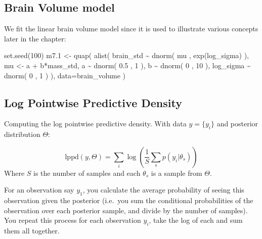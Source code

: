 \documentclass[
]{book}
\newenvironment{Shaded}{\begin{snugshade}}{\end{snugshade}}
\newcommand{\AttributeTok}[1]{\textcolor[rgb]{0.77,0.63,0.00}{#1}}
\newcommand{\DecValTok}[1]{\textcolor[rgb]{0.00,0.00,0.81}{#1}}
\newcommand{\FloatTok}[1]{\textcolor[rgb]{0.00,0.00,0.81}{#1}}
\newcommand{\FunctionTok}[1]{\textcolor[rgb]{0.00,0.00,0.00}{#1}}
\newcommand{\NormalTok}[1]{#1}
\newcommand{\OtherTok}[1]{\textcolor[rgb]{0.56,0.35,0.01}{#1}}
\newcommand{\SpecialCharTok}[1]{\textcolor[rgb]{0.00,0.00,0.00}{#1}}
\begin{document}
\hypertarget{brain-volume-model}{%
\subsection*{Brain Volume model}\label{brain-volume-model}}

We fit the linear brain volume model since it is used to illustrate various concepts later in the chapter:

\begin{Shaded}
\begin{Highlighting}[]
\FunctionTok{set.seed}\NormalTok{(}\DecValTok{100}\NormalTok{)}
\NormalTok{m7}\FloatTok{.1} \OtherTok{\textless{}{-}} \FunctionTok{quap}\NormalTok{( }\FunctionTok{alist}\NormalTok{(}
\NormalTok{  brain\_std }\SpecialCharTok{\textasciitilde{}} \FunctionTok{dnorm}\NormalTok{( mu , }\FunctionTok{exp}\NormalTok{(log\_sigma) ), }
\NormalTok{  mu }\OtherTok{\textless{}{-}}\NormalTok{ a }\SpecialCharTok{+}\NormalTok{ b}\SpecialCharTok{*}\NormalTok{mass\_std, }
\NormalTok{  a }\SpecialCharTok{\textasciitilde{}} \FunctionTok{dnorm}\NormalTok{( }\FloatTok{0.5}\NormalTok{ , }\DecValTok{1}\NormalTok{ ), }
\NormalTok{  b }\SpecialCharTok{\textasciitilde{}} \FunctionTok{dnorm}\NormalTok{( }\DecValTok{0}\NormalTok{ , }\DecValTok{10}\NormalTok{ ), }
\NormalTok{  log\_sigma }\SpecialCharTok{\textasciitilde{}} \FunctionTok{dnorm}\NormalTok{( }\DecValTok{0}\NormalTok{ , }\DecValTok{1}\NormalTok{ )}
\NormalTok{), }\AttributeTok{data=}\NormalTok{brain\_volume )}
\end{Highlighting}
\end{Shaded}

\hypertarget{log-pointwise-predictive-density}{%
\subsection*{Log Pointwise Predictive Density}\label{log-pointwise-predictive-density}}

Computing the log pointwise predictive density. With data \(y = \{y_i\}\) and posterior distribution \(\Theta\):

\[
\text{lppd}(y,\Theta) = \sum_i \log \left( \frac{1}{S}\sum_s p(y_i | \theta_s) \right)
\]
Where \(S\) is the number of samples and each \(\theta_s\) is a sample from \(\Theta\).

For an observation say \(y_1\), you calculate the average probability of seeing this observation given the posterior (i.e.~you sum the conditional probabilities of the observation over each posterior sample, and divide by the number of samples). You repeat this process for each observation \(y_i\), take the log of each and sum them all together.
\end{document}

